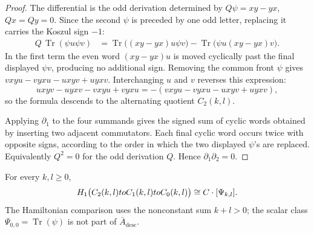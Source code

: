 \begin{proof}
  The differential is the odd derivation determined by
  \(Q\psi=xy-yx\), \(Qx=Qy=0\).  Since the second \(\psi\) is preceded
  by one odd letter, replacing it carries the Koszul sign \(-1\):
  \[
  \begin{aligned}
    Q\,\operatorname{Tr}(\psi u\psi v)
      &=
      \operatorname{Tr}\bigl((xy-yx)u\psi v\bigr)
      -\operatorname{Tr}\bigl(\psi u(xy-yx)v\bigr).
  \end{aligned}
  \]
  In the first term the even word \((xy-yx)u\) is moved cyclically past
  the final displayed \(\psi v\), producing no additional sign.  Removing
  the common front \(\psi\) gives
  \(vxyu-vyxu-uxyv+uyxv\).  Interchanging \(u\) and \(v\) reverses this
  expression:
  \[
    uxyv-uyxv-vxyu+vyxu=-(vxyu-vyxu-uxyv+uyxv),
  \]
  so the formula descends to the alternating quotient \(C_2(k,l)\).

  Applying \(\partial_1\) to the four summands gives the signed sum of
  cyclic words obtained by inserting two adjacent commutators.  Each
  final cyclic word occurs twice with opposite signs, according to the
  order in which the two displayed \(\psi\)'s are replaced.  Equivalently
  \(Q^2=0\) for the odd derivation \(Q\).  Hence
  \(\partial_1\partial_2=0\).
\end{proof}

\begin{thm}\label{thm:T5-one-psi-homology}
  For every \(k,l\ge0\),
  \[
    H_1\bigl(C_2(k,l)to C_1(k,l)to C_0(k,l)\bigr)
      \cong C\cdot[\Psi_{k,l}].
  \]
  The Hamiltonian comparison uses the nonconstant sum \(k+l>0\); the
  scalar class \(\Psi_{0,0}=\operatorname{Tr}(\psi)\) is not part of
  \(\bar A_{\mathrm{desc}}\).
\end{thm}

